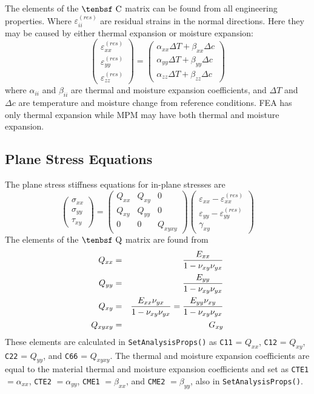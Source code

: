 \documentclass[11pt]{article}
\def\a#1{\alpha_{#1}}
\def\b#1{\beta_{#1}}
\def\C{\hbox{\tenbsf C}}
\def\code#1{{\small\tt #1}}
\def\DT{\Delta T}
\def\e#1{\varepsilon_{#1}}
\def\er#1{\varepsilon_{#1}^{(res)}}
\def\g#1{\gamma_{#1}}
\def\Q{\hbox{\tenbsf Q}}
\def\s#1{\sigma_{#1}}
\def\t#1{\tau_{#1}}
\def\v#1{\nu_{#1}}
\def\vvec#1#2#3{\left(\begin{array}{ccc} #1 \\ #2 \\ #3 \end{array}\right)}
\def\symmat#1#2#3#4#5#6{\left(\begin{array}{ccc} #1 & #2 & #3 \\ #2 & #4 & #5 \\
                                                      #3 & #5 & #6 \end{array}\right)}
\begin{document}
The elements of the $\C$ matrix can be found from all engineering properties. Where $\er{ii}$ are  residual strains in the normal directions. Here they may be caused by either thermal expansion or moisture expansion:
\begin{equation}
\left(\begin{array}{c} \er{xx} \\ \er{yy} \\ \er{zz} \end{array}\right)
       =  \left(\begin{array}{c}
	\a{xx}\DT + \b{xx}\Delta c \\
	\a{yy}\DT + \b{yy}\Delta c \\
	\a{zz}\DT + \b{zz}\Delta c  \end{array}\right)
\end{equation}
where $\a{ii}$ and $\b{ii}$ are thermal and moisture expansion coefficients, and $\DT$ and $\Delta c$ are temperature and moisture change from reference conditions. FEA has only thermal expansion while MPM may have both thermal and moisture expansion.

\subsection{Plane Stress Equations}

The plane stress stiffness equations for in-plane stresses are
\begin{equation}
      \vvec{\s{xx}}{\s{yy}}{\t{xy}} = \symmat{Q_{xx}}{Q_{xy}}{0}{Q_{yy}}{0}{Q_{xyxy}}
          \vvec{\e{xx} - \er{xx}}{\e{yy} - \er{yy}}{\g{xy}}
 \end{equation}
The elements of the $\Q$ matrix are found from
\begin{eqnarray}%
   Q_{xx} &  = &  {E_{xx}\over 1 - \v{xy}\v{yx}} \\
   Q_{yy} & = & {E_{yy}\over 1 - \v{xy}\v{yx}} \\
   Q_{xy} &  = & {E_{xx}\v{yx}\over 1 - \v{xy}\v{yx}}  =  {E_{yy}\v{xy}\over 1 - \v{xy}\v{yx}}\\
   Q_{xyxy} & = &  G_{xy} 
\end{eqnarray}%
These elements are calculated in \code{SetAnalysisProps()} as \code{C11} = $Q_{xx}$, \code{C12} = $Q_{xy}$, \code{C22} = $Q_{yy}$, and \code{C66} = $Q_{xyxy}$. The thermal  and moisture expansion coefficients are equal to the material thermal  and moisture expansion coefficients and set as \code{CTE1} $=\a{xx}$, \code{CTE2} $=\a{yy}$, \code{CME1} $=\b{xx}$, and \code{CME2} $=\b{yy}$, also in \code{SetAnalysisProps()}.
\end{document}
